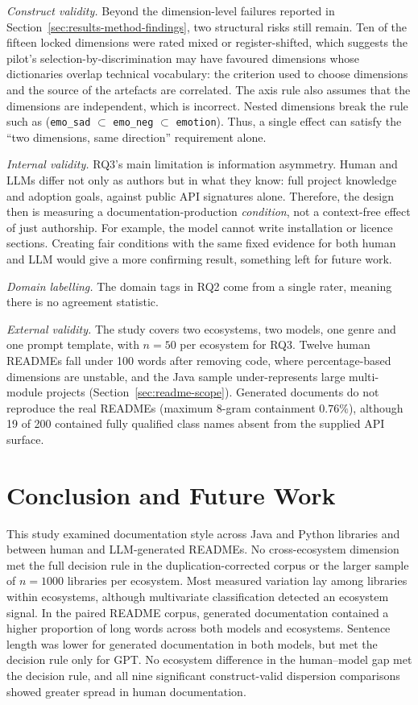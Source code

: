 \documentclass[conference]{IEEEtran}
\begin{document}
\emph{Construct validity.} Beyond the dimension-level failures reported in Section~\ref{sec:results-method-findings}, two structural risks still remain. Ten of the fifteen locked dimensions were rated mixed or register-shifted, which suggests the pilot's selection-by-discrimination may have favoured dimensions whose dictionaries overlap technical vocabulary: the criterion used to choose dimensions and the source of the artefacts are correlated. The axis rule also assumes that the dimensions are independent, which is incorrect. Nested dimensions break the rule such as (\texttt{emo\_sad} $\subset$ \texttt{emo\_neg} $\subset$ \texttt{emotion}). Thus, a single effect can satisfy the ``two dimensions, same direction'' requirement alone.

\emph{Internal validity.} RQ3's main limitation is information asymmetry. Human and LLMs differ not only as authors but in what they know: full project knowledge and adoption goals, against public API signatures alone. Therefore, the design then is measuring a documentation-production \emph{condition}, not a context-free effect of just authorship. For example, the model cannot write installation or licence sections. Creating fair conditions with the same fixed evidence for both human and LLM would give a more confirming result, something left for future work.

\emph{Domain labelling.} The domain tags in RQ2 come from a single rater, meaning there is no agreement statistic. 

\emph{External validity.} The study covers two ecosystems, two models, one genre and one prompt template, with $n=50$ per ecosystem for RQ3. Twelve human READMEs fall under 100 words after removing code, where percentage-based dimensions are unstable, and the Java sample under-represents large multi-module projects
(Section~\ref{sec:readme-scope}). Generated documents do not reproduce the real READMEs (maximum 8-gram containment $0.76\%$), although 19 of 200 contained fully qualified class names absent from the supplied API surface.

\section{Conclusion and Future Work}
\label{sec:conclusion}

This study examined documentation style across Java and Python libraries and between human and LLM-generated READMEs. No cross-ecosystem dimension met the full decision rule in the duplication-corrected corpus or the larger sample of $n=1000$ libraries per ecosystem. Most measured variation lay among libraries within ecosystems, although multivariate classification detected an ecosystem signal. In the paired README corpus, generated documentation contained a higher proportion of long words across both models and ecosystems. Sentence length was lower for generated documentation in both models, but met the decision rule only for GPT. No ecosystem difference in the human--model gap met the decision rule, and all nine significant construct-valid dispersion comparisons showed greater spread in human documentation.
\end{document}
